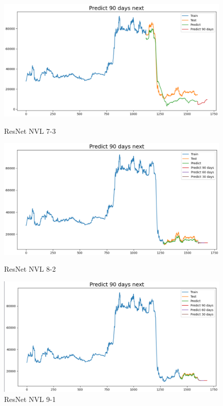 \documentclass[conference]{IEEEtran}
\begin{document}
\begin{figure}[htbp]
    \begin{minipage}{0.23\textwidth}
    \centering
    \includegraphics[width=1\textwidth]{experiment/resnet/NVL 7_3.png}
    \caption{ResNet NVL 7-3}
    \label{fig:nvl_boxplot}
    \end{minipage}
    \hfill
    \begin{minipage}{0.23\textwidth}
    \centering
    \includegraphics[width=1\textwidth]{experiment/resnet/NVL 8_2.png}
    \caption{ResNet NVL 8-2}
    \label{fig:nvl_histogram}
    \end{minipage}
    \begin{minipage}{0.23\textwidth}
    \centering
    \includegraphics[width=1\textwidth]{experiment/resnet/NVL 9_1.png}
    \caption{ResNet NVL 9-1}
    \label{fig:nvl_histogram}
    \end{minipage}
\end{figure}
\end{document}
